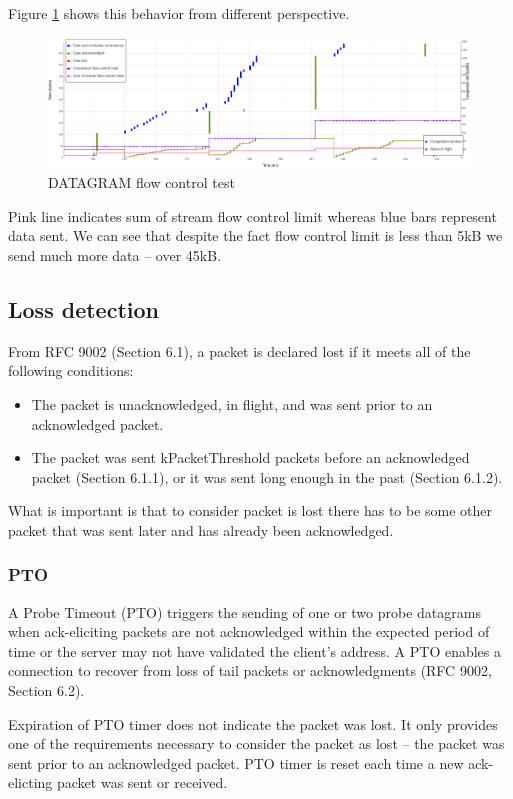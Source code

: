 Figure \ref{fig:dgram_flow_control2} shows this behavior from different perspective.
\begin{figure}
  \centering
  \includegraphics[width=\textwidth]{img/__09__datagrams/dgram_flow_control_2.png}
  \caption{DATAGRAM flow control test}
  \label{fig:dgram_flow_control2}
\end{figure}
Pink line indicates sum of stream flow control limit whereas blue bars represent data sent. 
We can see that despite the fact flow control limit is less than 5kB we send much more data -- over 45kB.

\subsection{Loss detection}
\label{sec:loss-detection}
From RFC 9002 (Section 6.1), a packet is declared lost if it meets all of the following conditions:
\begin{itemize}
    \item The packet is unacknowledged, in flight, and was sent prior to an acknowledged packet.
    \item The packet was sent kPacketThreshold packets before an acknowledged packet (Section 6.1.1), or it was sent long enough in the past (Section 6.1.2). \cite{rfc9002}
\end{itemize}

What is important is that to consider packet is lost there has to be some other packet that was sent later and has already been acknowledged.

\subsubsection{PTO}
A Probe Timeout (PTO) triggers the sending of one or two probe datagrams when ack-eliciting packets are not acknowledged within the expected period of time or the server may not have validated the client's address. A PTO enables a connection to recover from loss of tail packets or acknowledgments \cite{rfc9002} (RFC 9002, Section 6.2).

Expiration of PTO timer does not indicate the packet was lost.
It only provides one of the requirements necessary to consider the packet as lost -- the packet was sent prior to an acknowledged packet. PTO timer is reset each time a new ack-elicting packet was sent or received.


